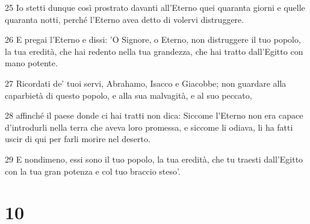 \par 25 Io stetti dunque così prostrato davanti all'Eterno quei quaranta giorni e quelle quaranta notti, perché l'Eterno avea detto di volervi distruggere.
\par 26 E pregai l'Eterno e dissi: 'O Signore, o Eterno, non distruggere il tuo popolo, la tua eredità, che hai redento nella tua grandezza, che hai tratto dall'Egitto con mano potente.
\par 27 Ricordati de' tuoi servi, Abrahamo, Isacco e Giacobbe; non guardare alla caparbietà di questo popolo, e alla sua malvagità, e al suo peccato,
\par 28 affinché il paese donde ci hai tratti non dica: Siccome l'Eterno non era capace d'introdurli nella terra che aveva loro promessa, e siccome li odiava, li ha fatti uscir di qui per farli morire nel deserto.
\par 29 E nondimeno, essi sono il tuo popolo, la tua eredità, che tu traesti dall'Egitto con la tua gran potenza e col tuo braccio steso'.

\chapter{10}

